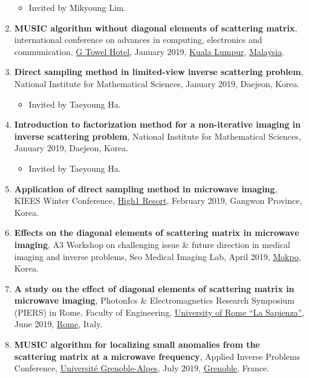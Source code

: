 \documentclass[10pt,A4]{article}
\begin{document}
\begin{enumerate}
\begin{itemize}
\item Invited by Mikyoung Lim.
\end{itemize}
\item\label{P-ACEC2019} \textbf{MUSIC algorithm without diagonal elements of scattering matrix},  international conference on advances in computing, electronics and communication, \href{http://www.gtowerhotel.com/}{G Towel Hotel}, January 2019, \href{http://www.kuala-lumpur.ws}{Kuala Lumpur}, \href{https://www.lonelyplanet.com/malaysia}{Malaysia}.
\item\label{P-NIMS2019A} \textbf{Direct sampling method in limited-view inverse scattering problem}, National Institute for Mathematical Sciences, January 2019, Daejeon, Korea.
    \begin{itemize}
\item Invited by Taeyoung Ha.
\end{itemize}
\item\label{P-NIMS2019B} \textbf{Introduction to factorization method for a non-iterative imaging in inverse scattering problem}, National Institute for Mathematical Sciences, January 2019, Daejeon, Korea.
    \begin{itemize}
\item Invited by Taeyoung Ha.
\end{itemize}
\item\label{P-KIEES2019A} \textbf{Application of direct sampling method in microwave imaging}, KIEES Winter Conference, \href{http://www.high1.com/eng/Hhome/main.high1}{High1 Resort}, February 2019, Gangwon Province, Korea.
\item\label{P-A32019} \textbf{Effects on the diagonal elements of scattering matrix in microwave imaging}, A3 Workshop on challenging issue \& future direction in medical imaging and inverse problems, Seo Medical Imaging Lab, April 2019, \href{http://www.mokpo.go.kr/eng}{Mokpo}, Korea.
\item\label{P-PIERS2019A} \textbf{A study on the effect of diagonal elements of scattering matrix in microwave imaging}, PhotonIcs \& Electromagnetics Research Symposium (PIERS) in Rome, Faculty of Engineering, \href{https://www.uniroma1.it/en}{University of Rome ``La Sapienza''}, June 2019, \href{https://www.comune.roma.it/web/it/welcome.page}{Rome}, Italy.
\item\label{P-AIP2019} \textbf{MUSIC algorithm for localizing small anomalies from the scattering matrix at a microwave frequency},  Applied Inverse Problems Conference, \href{https://www.univ-grenoble-alpes.fr/le-campus-de-saint-martin-d-heres/le-campus-de-saint-martin-d-heres-369727.kjsp}{Universit\'e Grenoble-Alpes}, July 2019, \href{https://www.grenoble.fr}{Grenoble}, France.

\end{enumerate}
\end{document}
